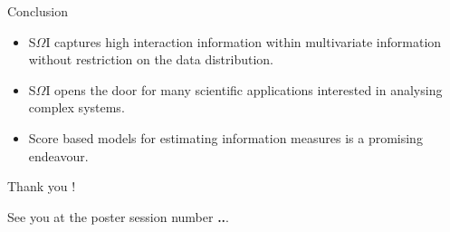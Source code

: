 \documentclass{beamer}
\begin{document}
\begin{frame}{Conclusion}
\begin{itemize}
    \item S$\Omega$I captures high interaction information within multivariate information without restriction on the data distribution.
    \item S$\Omega$I opens the door for many scientific applications interested in analysing complex systems.
    \item Score based models for estimating information measures is a promising endeavour. 
\end{itemize}

\end{frame}


\begin{frame}{Thank you !}

 See you at the poster session number \textbf{..}.


\end{frame}
\end{document}
